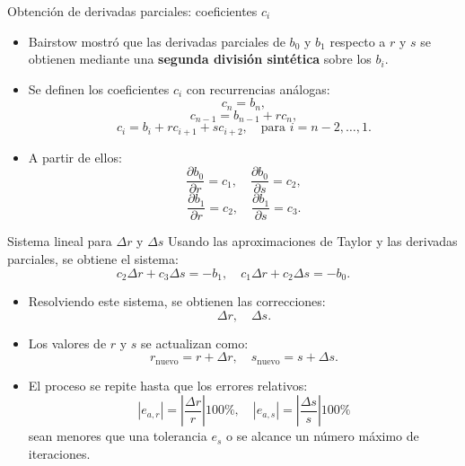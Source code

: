 \documentclass[../../main.tex]{subfiles}
\begin{document}
\begin{frame}{Obtención de derivadas parciales: coeficientes \(c_i\)}
  \begin{itemize}
    \item Bairstow mostró que las derivadas parciales de \(b_0\) y \(b_1\)
          respecto a \(r\) y \(s\) se obtienen mediante una \textbf{segunda división sintética}
          sobre los \(b_i\).
    \item Se definen los coeficientes \(c_i\) con recurrencias análogas:
      \[
        c_n = b_n,
      \]
      \[
        c_{n-1} = b_{n-1} + r c_n,
      \]
      \[
        c_i = b_i + r c_{i+1} + s c_{i+2}, \quad \text{para } i = n-2,\dots,1.
      \]
    \item A partir de ellos:
      \[
        \frac{\partial b_0}{\partial r} = c_1, \quad
        \frac{\partial b_0}{\partial s} = c_2,
      \]
      \[
        \frac{\partial b_1}{\partial r} = c_2, \quad
        \frac{\partial b_1}{\partial s} = c_3.
      \]
  \end{itemize}
\end{frame}

\begin{frame}{Sistema lineal para \(\Delta r\) y \(\Delta s\)}
  Usando las aproximaciones de Taylor y las derivadas parciales, se obtiene el sistema:
  \[
    c_2 \Delta r + c_3 \Delta s = -b_1,
 \quad
    c_1 \Delta r + c_2 \Delta s = -b_0.
  \]

  \begin{itemize}
    \item Resolviendo este sistema, se obtienen las correcciones:
      \[
        \Delta r, \quad \Delta s.
      \]
    \item Los valores de \(r\) y \(s\) se actualizan como:
      \[
        r_{\text{nuevo}} = r + \Delta r, \quad
        s_{\text{nuevo}} = s + \Delta s.
      \]
    \item El proceso se repite hasta que los errores relativos:
      \[
        |e_{a,r}| = \left|\frac{\Delta r}{r}\right| 100\%, \quad
        |e_{a,s}| = \left|\frac{\Delta s}{s}\right| 100\%
      \]
      sean menores que una tolerancia \(e_s\) o se alcance un número máximo de iteraciones.
  \end{itemize}
\end{frame}
\end{document}
